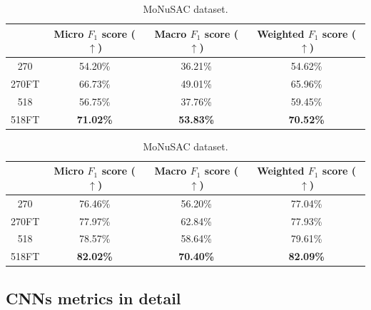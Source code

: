 \begin{table}[ht]
\vspace{0.5cm}

    \begin{tabular}{c|c|c|c|}
  \cline{2-4}
  & Micro $F_1$ score ($\uparrow$) & Macro $F_1$ score ($\uparrow$) & Weighted $F_1$ score ($\uparrow$) \\ \hline
\multicolumn{1}{|c|}{270}  & 54.20\% & 36.21\% & 54.62\% \\ \hline
\multicolumn{1}{|c|}{270FT}  & 66.73\% & 49.01\% & 65.96\% \\ \hline
\multicolumn{1}{|c|}{518}  & 56.75\% & 37.76\% & 59.45\% \\ \hline
\multicolumn{1}{|c|}{518FT}  & \textbf{71.02\%} & \textbf{53.83\%} & \textbf{70.52\%} \\ \hline
\end{tabular}
\caption{CoNSeP dataset.}
\label{tab:consep-scaling}

\vspace{0.5cm}

\begin{tabular}{c|c|c|c|}
  \cline{2-4}
  & Micro $F_1$ score ($\uparrow$) & Macro $F_1$ score ($\uparrow$) & Weighted $F_1$ score ($\uparrow$)  \\ \hline
\multicolumn{1}{|c|}{270}  & 76.46\% & 56.20\% & 77.04\% \\ \hline
\multicolumn{1}{|c|}{270FT}  & 77.97\% & 62.84\% & 77.93\% \\ \hline
\multicolumn{1}{|c|}{518}  & 78.57\% & 58.64\% & 79.61\% \\ \hline
\multicolumn{1}{|c|}{518FT}  & \textbf{82.02\%} & \textbf{70.40\%} & \textbf{82.09\%} \\ \hline
\end{tabular}
\caption{MoNuSAC dataset.}
    \label{tab:scaling}
\end{table}

\newpage
\subsection{CNNs metrics in detail}

